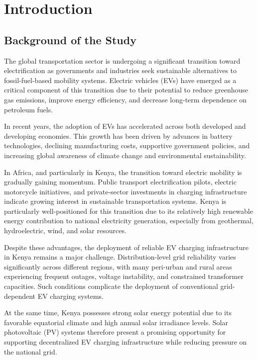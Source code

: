\section{Introduction}

\subsection{Background of the Study}

The global transportation sector is undergoing a significant transition toward electrification as governments and industries seek sustainable alternatives to fossil-fuel-based mobility systems. Electric vehicles (EVs) have emerged as a critical component of this transition due to their potential to reduce greenhouse gas emissions, improve energy efficiency, and decrease long-term dependence on petroleum fuels.

In recent years, the adoption of EVs has accelerated across both developed and developing economies. This growth has been driven by advances in battery technologies, declining manufacturing costs, supportive government policies, and increasing global awareness of climate change and environmental sustainability.

In Africa, and particularly in Kenya, the transition toward electric mobility is gradually gaining momentum. Public transport electrification pilots, electric motorcycle initiatives, and private-sector investments in charging infrastructure indicate growing interest in sustainable transportation systems. Kenya is particularly well-positioned for this transition due to its relatively high renewable energy contribution to national electricity generation, especially from geothermal, hydroelectric, wind, and solar resources.

Despite these advantages, the deployment of reliable EV charging infrastructure in Kenya remains a major challenge. Distribution-level grid reliability varies significantly across different regions, with many peri-urban and rural areas experiencing frequent outages, voltage instability, and constrained transformer capacities. Such conditions complicate the deployment of conventional grid-dependent EV charging systems.

At the same time, Kenya possesses strong solar energy potential due to its favorable equatorial climate and high annual solar irradiance levels. Solar photovoltaic (PV) systems therefore present a promising opportunity for supporting decentralized EV charging infrastructure while reducing pressure on the national grid.

